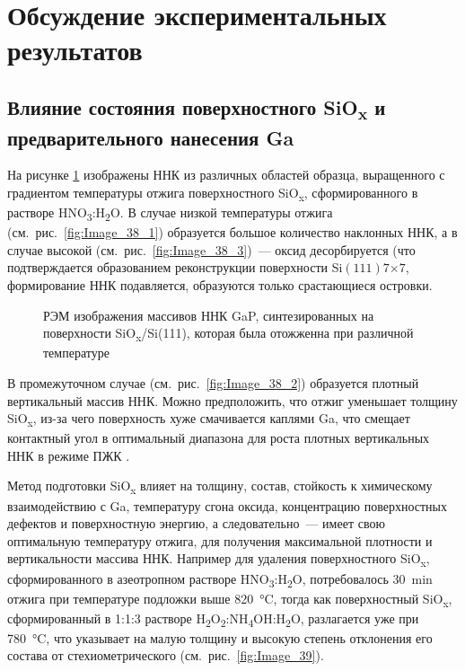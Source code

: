 \section{Обсуждение экспериментальных результатов}\label{sec:ch6/sec2}

\subsection{Влияние состояния поверхностного SiO\textsubscript{x} и
предварительного нанесения Ga}\label{subsec:ch6/sec2/sub1}

На рисунке \cref{fig:Image_38} изображены ННК из различных областей образца,
выращенного с градиентом температуры отжига поверхностного
SiO\textsubscript{x}, сформированного в растворе
HNO\textsubscript{3}:H\textsubscript{2}O. В случае низкой температуры отжига
(см.~рис.~\cref{fig:Image_38_1}) образуется большое количество наклонных ННК, а
в случае высокой (см.~рис.~\cref{fig:Image_38_3})~--- оксид десорбируется (что
подтверждается образованием реконструкции поверхности
Si\((111)7\)\(\times\)\(7\), формирование ННК подавляется, образуются только
срастающиеся островки.

\begin{figure}[ht]  \caption{РЭМ
		изображения массивов ННК GaP, синтезированных на поверхности
	SiO\textsubscript{x}/Si(111), которая была отожженна при различной
температуре}\label{fig:Image_38} \end{figure}

В промежуточном случае (см.~рис.~\cref{fig:Image_38_2}) образуется плотный
вертикальный массив ННК. Можно предположить, что отжиг уменьшает толщину
SiO\textsubscript{x}, из-за чего поверхность хуже смачивается каплями Ga, что
смещает контактный угол в оптимальный диапазона для роста плотных вертикальных
ННК в режиме ПЖК \cite{Matteini2015}.

Метод подготовки SiO\textsubscript{x} влияет на толщину, состав, стойкость к
химическому взаимодействию с Ga, температуру сгона оксида, концентрацию
поверхностных дефектов и поверхностную энергию, а следовательно~--- имеет свою
оптимальную температуру отжига, для получения максимальной плотности и
вертикальности массива ННК. Например для удаления поверхностного
SiO\textsubscript{x}, сформированного в азеотропном растворе
HNO\textsubscript{3}:H\textsubscript{2}O, потребовалось 30~\si{\minute} отжига
при температуре подложки выше 820~\si{\degreeCelsius}, тогда как поверхностный
SiO\textsubscript{x}, сформированный в 1:1:3 растворе
H\textsubscript{2}O\textsubscript{2}:NH\textsubscript{4}OH:H\textsubscript{2}O,
разлагается уже при 780~\si{\degreeCelsius}, что указывает на малую толщину и
высокую степень отклонения его состава от стехиометрического
(см.~рис.~\cref{fig:Image_39}).

